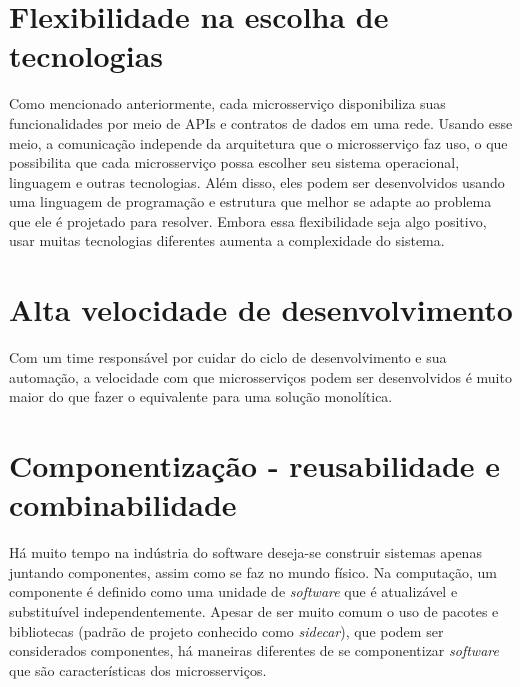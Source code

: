 
\section{Flexibilidade na escolha de tecnologias}

Como mencionado anteriormente, cada microsserviço disponibiliza suas funcionalidades por meio de APIs e contratos de dados em uma rede. Usando esse meio, a comunicação independe da arquitetura que o microsserviço faz uso, o que possibilita que cada microsserviço possa escolher seu sistema operacional, linguagem e outras tecnologias. Além disso, eles podem ser desenvolvidos usando uma linguagem de programação e estrutura que melhor se adapte ao problema que ele é projetado para resolver. Embora essa flexibilidade seja algo positivo, usar muitas tecnologias diferentes aumenta a complexidade do sistema. \cite{oracle_microservices, Familiar2015}

\section{Alta velocidade de desenvolvimento}

Com um time responsável por cuidar do ciclo de desenvolvimento e sua automação, a velocidade com que microsserviços podem ser desenvolvidos é muito maior do que fazer o equivalente para uma solução monolítica. \cite{Familiar2015}

\section{Componentização - reusabilidade e combinabilidade}

Há muito tempo na indústria do software deseja-se construir sistemas apenas juntando componentes, assim como se faz no mundo físico. Na computação, um componente é definido como uma unidade de \emph{software} que é atualizável e substituível independentemente. Apesar de ser muito comum o uso de pacotes e bibliotecas (padrão de projeto conhecido como \emph{sidecar}), que podem ser considerados componentes, há maneiras diferentes de se componentizar \emph{software} que são características dos microsserviços. \cite{martin-fowler-microservices}


